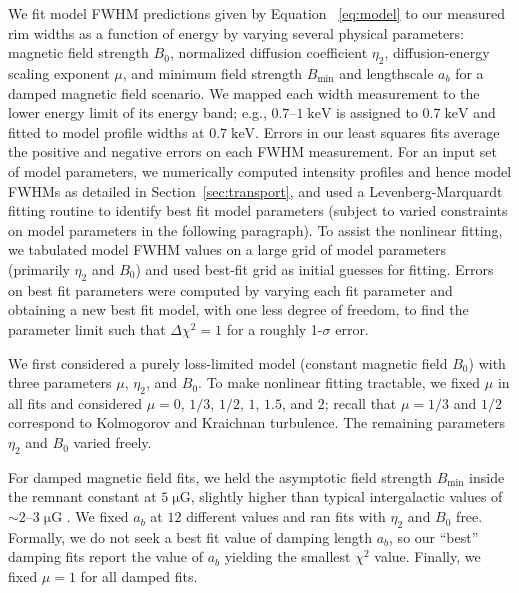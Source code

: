 \documentclass[iop, apj, numberedappendix]{emulateapj}
\newcommand*{\mt}{\mathrm}
\newcommand*{\unit}[1]{\;\mt{#1}}  %
\newcommand*{\abt}{\mathord{\sim}} %
\newcommand*{\Bmin}{B_{\mt{min}}}
\newcommand*{\muG}{\unit{\mu G}}
\begin{document}
We fit model FWHM predictions given by Equation~ \eqref{eq:model} to our
measured rim widths as a function of energy by varying several physical
parameters: magnetic field strength $B_0$, normalized diffusion coefficient
$\eta_2$, diffusion-energy scaling exponent $\mu$, and minimum field strength
$\Bmin$ and lengthscale $a_b$ for a damped magnetic field scenario.  We
mapped each width measurement to the lower energy limit of its energy band;
e.g., $0.7$--$1 \unit{keV}$ is assigned to $0.7 \unit{keV}$ and fitted to model
profile widths at $0.7 \unit{keV}$.  Errors in our least squares fits average
the positive and negative errors on each FWHM measurement.  For an input set of
model parameters, we numerically computed intensity profiles and hence model
FWHMs as detailed in Section~\ref{sec:transport}, and used a
Levenberg-Marquardt fitting routine to identify best fit model parameters
(subject to varied constraints on model parameters in the following paragraph).
To assist the nonlinear fitting, we tabulated model FWHM values on a large grid
of model parameters (primarily $\eta_2$ and $B_0$) and used best-fit grid as
initial guesses for fitting.
Errors on best fit parameters were computed by varying each fit parameter and
obtaining a new best fit model, with one less degree of freedom, to find the
parameter limit such that $\Delta \chi^2 = 1$ for a roughly 1-$\sigma$ error.

We first considered a purely loss-limited model (constant magnetic field
$B_0$) with three parameters $\mu$, $\eta_2$, and $B_0$.  To make nonlinear
fitting tractable, we fixed $\mu$ in all fits and considered $\mu = 0$, $1/3$,
$1/2$, $1$, $1.5$, and $2$; recall that $\mu = 1/3$ and $1/2$ correspond to
Kolmogorov and Kraichnan turbulence.  The remaining parameters $\eta_2$ and
$B_0$ varied freely.

For damped magnetic field fits, we held the asymptotic field strength
$\Bmin$ inside the remnant constant at $5 \muG$, slightly higher than
typical intergalactic values of $\abt 2$--$3 \muG$ \citep{lyne1989, han2006}.
We fixed $a_b$ at $12$ different values and ran fits with $\eta_2$ and $B_0$
free.  Formally, we do not seek a best fit value of damping length $a_b$, so
our ``best'' damping fits report the value of $a_b$ yielding the smallest
$\chi^2$ value.  Finally, we fixed $\mu = 1$ for all damped fits.
\end{document}

